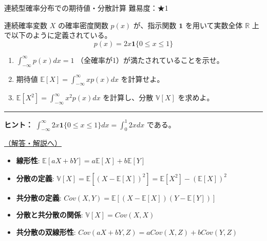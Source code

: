 \begin{questionbox}[label=q:1-1-3]{連続型確率分布での期待値・分散計算 \hfill \normalfont \small 難易度：★1}

連続確率変数 \(X\) の確率密度関数 \(p(x)\) が、指示関数
\(\boldsymbol{1}\) を用いて実数全体 \(\mathbb{R}\)
上で以下のように定義されている。 \[
p(x) = 2x \boldsymbol{1}\{0 \le x \le 1\}
\]

\begin{enumerate}
\def\labelenumi{\arabic{enumi}.}
\tightlist
\item
  \(\int_{-\infty}^\infty p(x) dx = 1\)
  （全確率が1）が満たされていることを示せ。
\item
  期待値 \(\mathbb{E}[X] = \int_{-\infty}^\infty x p(x) dx\)
  を計算せよ。
\item
  \(\mathbb{E}[X^2] = \int_{-\infty}^\infty x^2 p(x) dx\) を計算し、分散
  \(\mathbb{V}[X]\) を求めよ。
\end{enumerate}

\begin{center}\rule{0.5\linewidth}{0.5pt}\end{center}

\textbf{ヒント：}
\(\int_{-\infty}^\infty 2x \boldsymbol{1}\{0 \le x \le 1\} dx = \int_0^1 2x dx\)
である。

\hfill 

\hyperref[a:1-1-3]{（解答・解説へ）}

\end{questionbox}

\begin{tcolorbox}[enhanced, colback=blue!2!white, colframe=blue!60!black, fonttitle=\bfseries, drop shadow, title={【復習とヒント】期待値・分散・共分散の性質}]

\begin{itemize}
\tightlist
\item
  \textbf{線形性}:
  \(\mathbb{E}[aX + bY] = a\mathbb{E}[X] + b\mathbb{E}[Y]\)
\item
  \textbf{分散の定義}:
  \(\mathbb{V}[X] = \mathbb{E}[(X - \mathbb{E}[X])^2] = \mathbb{E}[X^2] - (\mathbb{E}[X])^2\)
\item
  \textbf{共分散の定義}:
  \(Cov(X,Y) = \mathbb{E}[(X - \mathbb{E}[X])(Y - \mathbb{E}[Y])]\)
\item
  \textbf{分散と共分散の関係}: \(\mathbb{V}[X] = Cov(X,X)\)
\item
  \textbf{共分散の双線形性}: \(Cov(aX+bY, Z) = aCov(X,Z) + bCov(Y,Z)\)
\end{itemize}

\end{tcolorbox}

